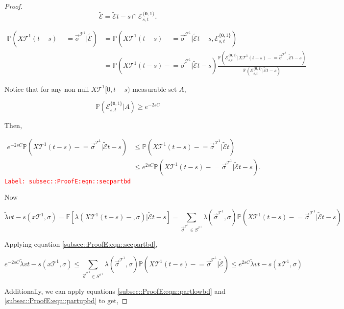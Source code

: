 \documentclass[12pt]{article}
\newcommand{\mb}{\mathbb}
\newcommand{\mc}{\mathcal}
\newcommand{\tr}{\textcolor{red}}
\newcommand{\labe}[1]{\tr{\texttt{Label: #1}}}
\newcommand{\pr}{\mb{P}}							%
\newcommand{\ex}[1]{\mb{E}\left[#1\right]}			%
\renewcommand{\root}{\mathbf{0}}				%
\renewcommand{\v}{v}							%
\renewcommand{\S}{S}							%
\newcommand{\s}{\sigma}							%
\newcommand{\sv}{\vec{\s}}						%
\newcommand{\x}{x}								%
\renewcommand{\t}{t}							%
\renewcommand{\tt}{s}							%
\newcommand{\X}{X}								%
\newcommand{\carp}[1]{^{#1}}					%
\newcommand{\vsi}[1]{^{#1}}						%
\newcommand{\cind}[1]{_{#1}}					%
\newcommand{\const}{C}							%
\newcommand{\tree}{\mc{T}}						%
\newcommand{\sln}[1]{^{#1}}						%
\newcommand{\rate}{\lambda}						%
\newcommand{\alt}[1]{\widetilde{#1}}			%
\newcommand{\evnt}{\mc{E}}						%
\newcommand{\typset}{A}							%
\newcommand{\crate}{\alt{\lambda}}				%
\begin{document}
\begin{proof}
\[\alt{\evnt}{	} = \alt{\evnt}{\t-\tt}\cap \evnt{}^{\{\root,1\}}_{\tt,\t}.\]

\begin{align*}
\pr\left(\X{\tree\sln{1}}{(\t-\tt)-}=\sv\cind{}\vsi{\tree\sln{1}}|\alt{\evnt}{	}\right) &= \pr\left(\X{\tree\sln{1}}{(\t-\tt)-}=\sv\cind{}\vsi{\tree\sln{1}}|\alt{\evnt}{\t-\tt},\evnt{}^{\{\root,1\}}_{\tt,\t}\right)\\
&=\pr\left(\X{\tree\sln{1}}{(\t-\tt)-}=\sv\cind{}\vsi{\tree\sln{1}}|\alt{\evnt}{\t-\tt}\right)\frac{\pr\left(\evnt{}^{\{\root,1\}}_{\tt,\t}|\X{\tree\sln{1}}{(\t-\tt)-}=\sv\cind{}\vsi{\tree\sln{1}},\alt{\evnt}{\t-\tt}\right)}{\pr\left(\evnt{}^{\{\root,1\}}_{\tt,\t}|\alt{\evnt}{\t-\tt}\right)}
\end{align*}

Notice that for any non-null \(\X{\tree\sln{1}}{[0,\t-\tt)}\)-measurable set \(\typset\), 

\[\pr(\evnt{}^{\{\root,1\}}_{\tt,\t}|\typset) \geq e^{-2\tt\const{}}\]

Then,

\begin{align}
e^{-2\tt\const{}}\pr\left(\X{\tree\sln{1}}{(\t-\tt)-}=\sv\cind{}\vsi{\tree\sln{1}}|\alt{\evnt}{\t-\tt}\right) &\leq \pr\left(\X{\tree\sln{1}}{(\t-\tt)-}=\sv\cind{}\vsi{\tree\sln{1}}|\alt{\evnt}{\t}\right)\nonumber\\
&\leq e^{2\tt\const{}}\pr\left(\X{\tree\sln{1}}{(\t-\tt)-}=\sv\cind{}\vsi{\tree\sln{1}}|\alt{\evnt}{\t-\tt}\right).
\label{subsec::ProofE:eqn::secpartbd}
\end{align}
\labe{subsec::ProofE:eqn::secpartbd}

Now

\[\crate{\v}{\t-\tt}(\x{\tree\sln{1}}{},\s) = \ex{\rate{}(\X{\tree\sln{1}}{(\t-\tt)-},\s)|\alt{\evnt}{\t-\tt}} = \sum_{\sv\cind{}\vsi{\tree\sln{1}}\in \S\carp{\tree\sln{1}}}\rate{}(\sv\cind{}\vsi{\tree\sln{1}},\s)\pr\left(\X{\tree\sln{1}}{(\t-\tt)-} = \sv\cind{}\vsi{\tree\sln{1}}|\alt{\evnt}{\t-\tt}\right)\]

Applying equation \eqref{subsec::ProofE:eqn::secpartbd},

\[e^{-2\tt\const{}}\crate{\v}{\t-\tt}(\x{\tree\sln{1}}{},\s) \leq \sum_{\sv\cind{}\vsi{\tree\sln{1}}\in \S\carp{\tree\sln{1}}} \lambda(\sv\cind{}\vsi{\tree\sln{1}},\s)\pr(\X{\tree\sln{1}}{(\t-\tt)-} = \sv\cind{}\vsi{\tree\sln{1}}|\alt{\evnt}{	})\leq e^{2\tt\const{}}\crate{\v}{\t-\tt}(\x{\tree\sln{1}}{},\s)\]

Additionally, we can apply equations \eqref{subsec::ProofE:eqn::partlowbd} and  \eqref{subsec::ProofE:eqn::partupbd} to get,


\end{proof}
\end{document}
